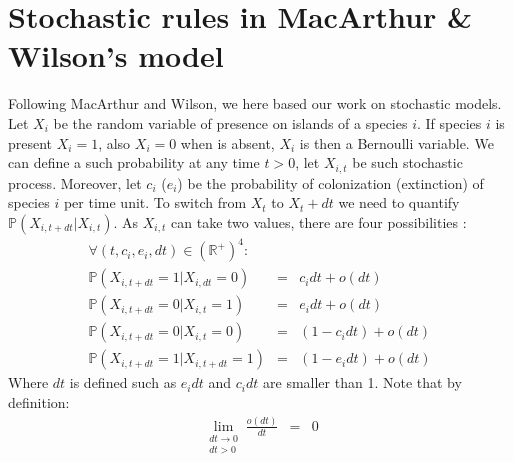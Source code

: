 \label{annII}
\addtocounter{chapter}{2}
\setcounter{equation}{0}

\section{Stochastic rules in MacArthur \& Wilson's model}

Following MacArthur and Wilson, we here based our work on stochastic models. Let $X_{i}$ be the random variable of presence on islands of a species $i$. If species $i$ is present $X_i=1$, also $X_i=0$  when is absent, $X_i$ is then a Bernoulli variable. We can define a such probability at any time $t>0$, let $X_{i,t}$ be such stochastic process. Moreover, let $c_i$ ($e_i$) be the probability of colonization (extinction) of species $i$ per time unit. To switch from $X_t$ to $X_t+dt$ we need to quantify $ \mathbb{P}(X_{i,t+dt}|X_{i,t})$. As $X_{i,t}$ can take two values, there are four possibilities :
\begin{eqnarray}
\nonumber \forall (t,c_i, e_i,dt)\in (\mathbb{R}^{+})^{4}: & &  \\
\label{eq1} \mathbb{P}(X_{i,t+dt}=1|X_{i,dt}=0)&=&c_idt+o(dt)\\
\label{eq2}  \mathbb{P}(X_{i,t+dt}=0|X_{i,t}=1)&=&e_idt+o(dt) \\
\label{eq3}  \mathbb{P}(X_{i,t+dt}=0|X_{i,t}=0)&=&(1-c_idt)+o(dt) \\
\label{eq4}  \mathbb{P}(X_{i,t+dt}=1|X_{i,t+dt}=1)&=&(1-e_idt)+o(dt)
\end{eqnarray}
Where $dt$ is defined such as $e_idt$ and $c_idt$ are smaller than 1. Note that by definition:
\begin{eqnarray}
\nonumber \lim\limits_{\substack{dt \to 0 \\ dt>0}}\frac{o(dt)}{dt}&=&0
\end{eqnarray}

